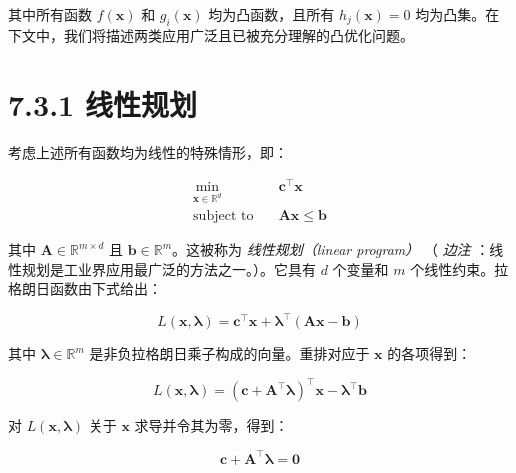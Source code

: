 其中所有函数 $ f(\boldsymbol{x}) $ 和 $ g_i(\boldsymbol{x}) $ 均为凸函数，且所有 $ h_j(\boldsymbol{x}) = 0 $ 均为凸集。在下文中，我们将描述两类应用广泛且已被充分理解的凸优化问题。

\section*{7.3.1 线性规划}

考虑上述所有函数均为线性的特殊情形，即：

\begin{equation}
\begin{aligned}
\min_{\boldsymbol{x} \in \mathbb{R}^d} \quad & \boldsymbol{c}^\top \boldsymbol{x} \\
\text{subject to} \quad & \boldsymbol{A} \boldsymbol{x} \leqslant \boldsymbol{b}
\end{aligned}
\tag{7.39}\label{eq:7-39}
\end{equation}

其中 $ \boldsymbol{A} \in \mathbb{R}^{m \times d} $ 且 $ \boldsymbol{b} \in \mathbb{R}^m $。这被称为 \emph{线性规划（linear program）} （ \emph{边注} ：线性规划是工业界应用最广泛的方法之一。）。它具有 $ d $ 个变量和 $ m $ 个线性约束。拉格朗日函数由下式给出：

\begin{equation}
L(\boldsymbol{x}, \boldsymbol{\lambda}) = \boldsymbol{c}^\top \boldsymbol{x} + \boldsymbol{\lambda}^\top (\boldsymbol{A} \boldsymbol{x} - \boldsymbol{b})
\tag{7.40}\label{eq:7-40}
\end{equation}

其中 $ \boldsymbol{\lambda} \in \mathbb{R}^m $ 是非负拉格朗日乘子构成的向量。重排对应于 $ \boldsymbol{x} $ 的各项得到：

\begin{equation}
L(\boldsymbol{x}, \boldsymbol{\lambda}) = (\boldsymbol{c} + \boldsymbol{A}^\top \boldsymbol{\lambda})^\top \boldsymbol{x} - \boldsymbol{\lambda}^\top \boldsymbol{b}
\tag{7.41}\label{eq:7-41}
\end{equation}

对 $ L(\boldsymbol{x}, \boldsymbol{\lambda}) $ 关于 $ \boldsymbol{x} $ 求导并令其为零，得到：

\begin{equation}
\boldsymbol{c} + \boldsymbol{A}^\top \boldsymbol{\lambda} = \boldsymbol{0}
\tag{7.42}\label{eq:7-42}
\end{equation}

